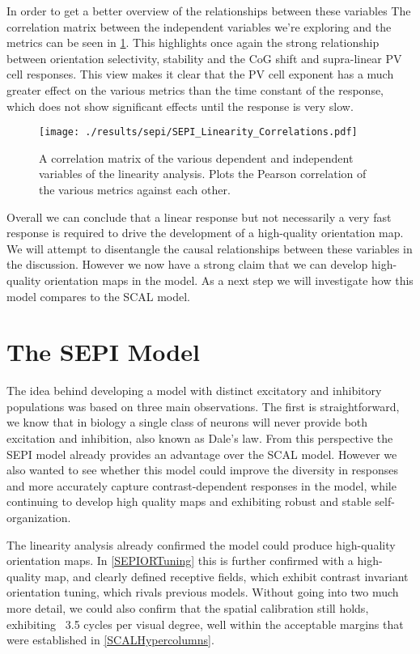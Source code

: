 In order to get a better overview of the relationships between these
variables The correlation matrix between the independent variables
we're exploring and the metrics can be seen in
\ref{SEPILinearityCorr}. This highlights once again the strong
relationship between orientation selectivity, stability and the CoG
shift and supra-linear PV cell responses. This view makes it clear
that the PV cell exponent has a much greater effect on the various
metrics than the time constant of the response, which does not show
significant effects until the response is very slow.

\begin{figure}
	\centering
        \texttt{[image: ./results/sepi/SEPI\_Linearity\_Correlations.pdf]}
	\caption{A correlation matrix of the various dependent and
      independent variables of the linearity analysis. Plots the
      Pearson correlation of the various metrics against each other.}
	\label{SEPILinearityCorr}
\end{figure}

Overall we can conclude that a linear response but not necessarily a
very fast response is required to drive the development of a
high-quality orientation map. We will attempt to disentangle the
causal relationships between these variables in the
discussion. However we now have a strong claim that we can develop
high-quality orientation maps in the model. As a next step we will
investigate how this model compares to the SCAL model.

\section{The SEPI Model}

The idea behind developing a model with distinct excitatory and
inhibitory populations was based on three main observations. The first
is straightforward, we know that in biology a single class of neurons
will never provide both excitation and inhibition, also known as
Dale's law. From this perspective the SEPI model already provides an
advantage over the SCAL model. However we also wanted to see whether
this model could improve the diversity in responses and more
accurately capture contrast-dependent responses in the model, while
continuing to develop high quality maps and exhibiting robust and
stable self-organization.

The linearity analysis already confirmed the model could produce
high-quality orientation maps. In \ref{SEPIORTuning} this is further
confirmed with a high-quality map, and clearly defined receptive
fields, which exhibit contrast invariant orientation tuning, which
rivals previous models. Without going into two much more detail, we
could also confirm that the spatial calibration still holds,
exhibiting ~3.5 cycles per visual degree, well within the acceptable
margins that were established in \ref{SCALHypercolumns}.

